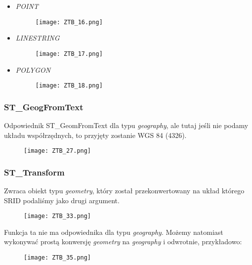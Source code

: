 \documentclass[a4paper,15pt]{article}
\newcommand{\example}[2]{
    \begin{tcolorbox}[colback=blue!5!white,colframe=blue,title={Przykład #1}]
        #2
    \end{tcolorbox}
}
\begin{document}
\example{- ST\_GeomFromText}{

\begin{itemize}
\item \textit{POINT}
\begin{figure}[H]
\centering
  \texttt{[image: ZTB\_16.png]}
\end{figure}

\item \textit{LINESTRING}
\begin{figure}[H]
\centering
  \texttt{[image: ZTB\_17.png]}
\end{figure}

\item \textit{POLYGON}
\begin{figure}[H]
\centering
  \texttt{[image: ZTB\_18.png]}
\end{figure}
\end{itemize}

}


\subsubsection{ST\_GeogFromText}
Odpowiednik ST\_GeomFromText dla typu \textit{geography}, ale tutaj jeśli nie podamy układu współrzędnych, to przyjęty zostanie WGS 84 (4326). 

\example{ - ST\_GeogFromText}{
\begin{figure}[H]
\centering
  \texttt{[image: ZTB\_27.png]}
\end{figure}
}


\subsubsection{ST\_Transform}
Zwraca obiekt typu \textit{geometry}, który został przekonwertowany na układ którego SRID podaliśmy jako drugi argument. 

\begin{figure}[H]
\centering
  \texttt{[image: ZTB\_33.png]}
\end{figure}

Funkcja ta nie ma odpowiednika dla typu \textit{geography}. Możemy natomiast wykonywać prostą konwersję \textit{geometry} na \textit{geography} i odwrotnie, przykładowo:

\begin{figure}[H]
\centering
  \texttt{[image: ZTB\_35.png]}
\end{figure}
\end{document}

